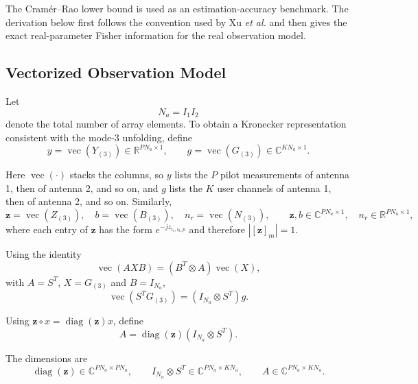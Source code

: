 \documentclass[12pt,a4paper]{article}
\begin{document}
The Cram\'er--Rao lower bound is used as an estimation-accuracy
benchmark. The derivation below first follows the convention used by
Xu \emph{et al.} and then gives the exact real-parameter Fisher
information for the real observation model.

\subsection{Vectorized Observation Model}

Let
\begin{equation}
N_a=I_1I_2
\tag{430}
\end{equation}
denote the total number of array elements. To obtain a Kronecker
representation consistent with the mode-3 unfolding, define
\begin{equation}
\boxed{
 y=\operatorname{vec}(Y_{(3)})
 \in\mathbb R^{PN_a\times1},
\qquad
 g=\operatorname{vec}(G_{(3)})
 \in\mathbb C^{KN_a\times1}.
}
\tag{431}
\end{equation}

Here $\operatorname{vec}(\cdot)$ stacks the columns, so $y$ lists the
$P$ pilot measurements of antenna 1, then of antenna 2, and so on, and
$g$ lists the $K$ user channels of antenna 1, then of antenna 2, and so
on. Similarly,
\begin{equation}
 \mathbf z=\operatorname{vec}(Z_{(3)}),
\quad
 b=\operatorname{vec}(B_{(3)}),
\quad
 n_r=\operatorname{vec}(N_{(3)}),
\qquad
\mathbf z,b\in\mathbb C^{PN_a\times1},
\quad
n_r\in\mathbb R^{PN_a\times1},
\tag{432}
\end{equation}
where each entry of $\mathbf z$ has the form $e^{-jz_{i_1,i_2,p}}$ and
therefore $|[\mathbf z]_m|=1$.

Using the identity
\begin{equation}
\operatorname{vec}(AXB)
=
(B^T\otimes A)\operatorname{vec}(X),
\tag{433}
\end{equation}
with $A=S^T$, $X=G_{(3)}$ and $B=I_{N_a}$,
\begin{equation}
\boxed{
\operatorname{vec}(S^TG_{(3)})
=
(I_{N_a}\otimes S^T)g.
}
\tag{434}
\end{equation}

Using $\mathbf z\circ x=\operatorname{diag}(\mathbf z)x$, define
\begin{equation}
\boxed{
 A
=
\operatorname{diag}(\mathbf z)
(I_{N_a}\otimes S^T).
}
\tag{435}
\end{equation}

The dimensions are
\begin{equation}
\operatorname{diag}(\mathbf z)\in\mathbb C^{PN_a\times PN_a},
\qquad
I_{N_a}\otimes S^T
\in\mathbb C^{PN_a\times KN_a},
\qquad
A\in\mathbb C^{PN_a\times KN_a}.
\tag{436}
\end{equation}
\end{document}
